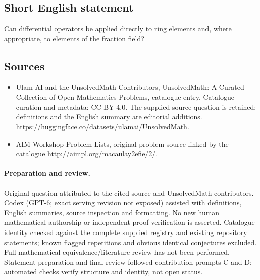 \documentclass[11pt]{article}
\begin{document}
\subsection{Short English statement}
Can differential operators be applied directly to ring elements and, where appropriate, to elements of the fraction field?
\subsection{Sources}
\begin{itemize}
\item[\hypertarget{source:statement:1}{S1}] Ulam AI and the UnsolvedMath Contributors, UnsolvedMath: A Curated Collection of Open Mathematics Problems, catalogue entry. Catalogue curation and metadata: CC BY 4.0. The supplied source question is retained; definitions and the English summary are editorial additions.
\url{https://huggingface.co/datasets/ulamai/UnsolvedMath}.
\item[\hypertarget{source:statement:2}{S2}] AIM Workshop Problem Lists, original problem source linked by the catalogue
\url{http://aimpl.org/macaulay2efie/2/}.
\end{itemize}
\paragraph{Preparation and review.}
Original question attributed to the cited source and UnsolvedMath contributors. Codex (GPT-6; exact serving revision not exposed) assisted with definitions, English summaries, source inspection and formatting. No new human mathematical authorship or independent proof verification is asserted. Catalogue identity checked against the complete supplied registry and existing repository statements; known flagged repetitions and obvious identical conjectures excluded. Full mathematical-equivalence/literature review has not been performed. Statement preparation and final review followed contribution prompts C and D; automated checks verify structure and identity, not open status.
\label{end:statement}
\end{document}
